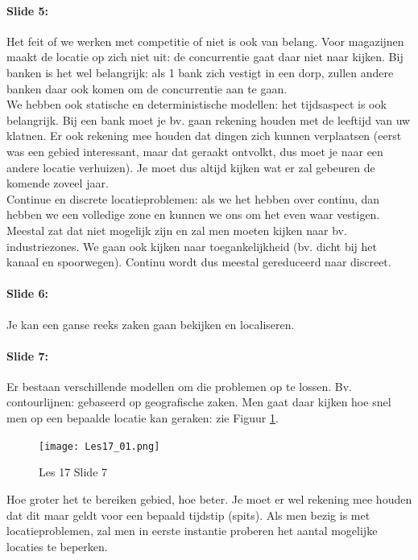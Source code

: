 \documentclass[10pt,a4paper]{report}
\begin{document}
\paragraph{Slide 5:} Het feit of we werken met competitie of niet is ook van belang. Voor magazijnen maakt de locatie op zich niet uit: de concurrentie gaat daar niet naar kijken. Bij banken is het wel belangrijk: als 1 bank zich vestigt in een dorp, zullen andere banken daar ook komen om de concurrentie aan te gaan.\\
We hebben ook statische en deterministische modellen: het tijdsaspect is ook belangrijk. Bij een bank moet je bv. gaan rekening houden met de leeftijd van uw klatnen. Er ook rekening mee houden dat dingen zich kunnen verplaatsen (eerst was een gebied interessant, maar dat geraakt ontvolkt, dus moet je naar een andere locatie verhuizen). Je moet dus altijd kijken wat er zal gebeuren de komende zoveel jaar.\\
Continue en discrete locatieproblemen: als we het hebben over continu, dan hebben we een volledige zone en kunnen we ons om het even waar vestigen. Meestal zat dat niet mogelijk zijn en zal men moeten kijken naar bv. industriezones. We gaan ook kijken naar toegankelijkheid (bv. dicht bij het kanaal en spoorwegen). Continu wordt dus meestal gereduceerd naar discreet.

\paragraph{Slide 6:} Je kan een ganse reeks zaken gaan bekijken en localiseren.

\paragraph{Slide 7:} Er bestaan verschillende modellen om die problemen op te lossen. Bv. contourlijnen: gebaseerd op geografische zaken. Men gaat daar kijken hoe snel men op een bepaalde locatie kan geraken: zie Figuur \ref{les17_01}.\\

\begin{figure}[h!]
\centering
\texttt{[image: Les17\_01.png]}
\caption{Les 17 Slide 7} 
\label{les17_01}
\end{figure}

Hoe groter het te bereiken gebied, hoe beter. Je moet er wel rekening mee houden dat dit maar geldt voor een bepaald tijdstip (spits). Als men bezig is met locatieproblemen, zal men in eerste instantie proberen het aantal mogelijke locaties te beperken.
\end{document}
